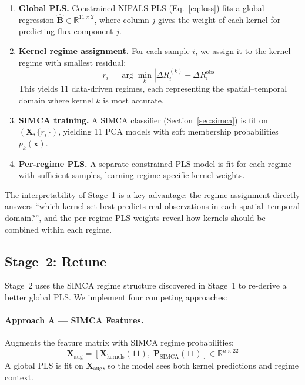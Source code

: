 \documentclass[11pt]{article}
\begin{document}
\begin{enumerate}[noitemsep]
  \item \textbf{Global PLS.} Constrained NIPALS-PLS
    (Eq.~\ref{eq:loss}) fits a global regression
    $\hat{\mathbf{B}} \in \mathbb{R}^{11 \times 2}$, where
    column $j$ gives the weight of each kernel for predicting
    flux component $j$.
  \item \textbf{Kernel regime assignment.} For each sample $i$,
    we assign it to the kernel regime with smallest residual:
    \begin{equation}
      r_i = \arg\min_{k} |\Delta R_i^{(k)} - \Delta R_i^\text{obs}|
      \label{eq:regime_assign}
    \end{equation}
    This yields 11 data-driven regimes, each representing the
    spatial--temporal domain where kernel $k$ is most accurate.
  \item \textbf{SIMCA training.} A SIMCA classifier
    (Section~\ref{sec:simca}) is fit on
    $(\mathbf{X}, \{r_i\})$, yielding 11 PCA models with
    soft membership probabilities $p_k(\mathbf{x})$.
  \item \textbf{Per-regime PLS.} A separate constrained PLS
    model is fit for each regime with sufficient samples,
    learning regime-specific kernel weights.
\end{enumerate}

The interpretability of Stage~1 is a key advantage: the regime
assignment directly answers ``which kernel set best predicts
real observations in each spatial--temporal domain?'', and the
per-regime PLS weights reveal how kernels should be combined
within each regime.

\subsection{Stage~2: Retune}
\label{sec:stage2}

Stage~2 uses the SIMCA regime structure discovered in Stage~1 to
re-derive a better global PLS. We implement four competing
approaches:

\paragraph{Approach A --- SIMCA Features.}
Augments the feature matrix with SIMCA regime probabilities:
\begin{equation}
  \mathbf{X}_\text{aug} = [\mathbf{X}_\text{kernels}(11),\;
    \mathbf{P}_\text{SIMCA}(11)] \in \mathbb{R}^{n \times 22}
  \label{eq:retune_a}
\end{equation}
A global PLS is fit on $\mathbf{X}_\text{aug}$, so the model
sees both kernel predictions and regime context.
\end{document}
